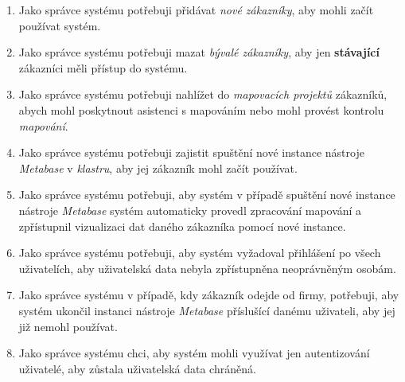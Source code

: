 \begin{enumerate}
    \item Jako správce systému potřebuji přidávat \textit{nové zákazníky}, aby mohli začít používat systém.
    \item Jako správce systému potřebuji mazat \textit{bývalé zákazníky}, aby jen \textbf{stávající} zákazníci měli přístup do systému.
    \item Jako správce systému potřebuji nahlížet do \textit{mapovacích projektů} zákazníků, abych mohl poskytnout asistenci s mapováním nebo mohl provést kontrolu \textit{mapování}.
    \item Jako správce systému potřebuji zajistit spuštění nové instance nástroje \textit{Metabase} v \textit{klastru}, aby jej zákazník  mohl začít používat.
    \item Jako správce systému potřebuji, aby systém v případě spuštění nové instance nástroje \textit{Metabase} systém automaticky provedl zpracování mapování a zpřístupnil vizualizaci dat daného zákazníka pomocí nové instance.
    \item Jako správce systému potřebuji, aby systém vyžadoval přihlášení po všech uživatelích, aby uživatelská data nebyla zpřístupněna neoprávněným osobám.
    \item Jako správce systému v případě, kdy zákazník odejde od firmy, potřebuji, aby systém ukončil instanci nástroje \textit{Metabase} příslušící danému uživateli, aby jej již nemohl používat.
    \item Jako správce systému chci, aby systém mohli využívat jen autentizování uživatelé, aby zůstala uživatelská data chráněná.
    
\end{enumerate}

